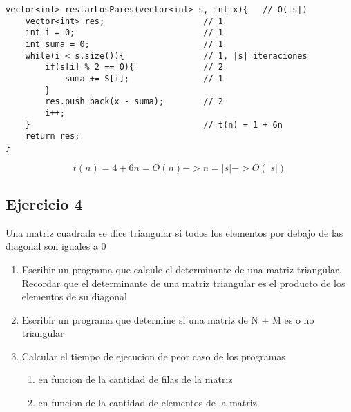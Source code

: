 \documentclass{article}
\begin{document}
\begin{lstlisting}
vector<int> restarLosPares(vector<int> s, int x){   // O(|s|)
    vector<int> res;                    // 1
    int i = 0;                          // 1
    int suma = 0;                       // 1
    while(i < s.size()){                // 1, |s| iteraciones
        if(s[i] % 2 == 0){              // 2
            suma += S[i];               // 1
        }                               
        res.push_back(x - suma);        // 2
        i++;                            
    }                                   // t(n) = 1 + 6n
    return res;
}
\end{lstlisting}
\begin{equation}
    t(n) = 4 + 6n = O(n) -> n = |s| -> O(|s|)
\end{equation}

\subsection{Ejercicio 4}    
Una matriz cuadrada se dice triangular si todos los elementos por debajo de las
diagonal son iguales a 0
\begin{enumerate}
    \item Escribir un programa que calcule el determinante de una matriz triangular.
    Recordar que el determinante de una matriz triangular es el producto de los elementos de su diagonal
    \item Escribir un programa que determine si una matriz de N + M es o no triangular
    \item Calcular el tiempo de ejecucion de peor caso de los programas
    \begin{enumerate}
        \item en funcion de la cantidad de filas de la matriz
        \item en funcion de la cantidad de elementos de la matriz
    \end{enumerate}
\end{enumerate}
\end{document}
